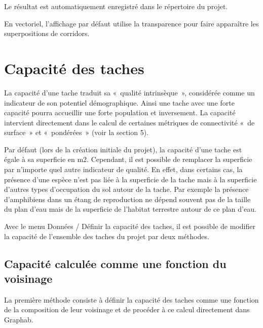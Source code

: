 \documentclass{article}
\begin{document}
Le résultat est automatiquement enregistré dans le répertoire du projet.

En vectoriel, l'affichage par défaut utilise la transparence pour faire apparaître les superpositions de corridors.


\section{Capacité des taches}

La capacité d’une tache traduit sa «~qualité intrinsèque~», considérée comme un indicateur de son potentiel démographique. Ainsi une tache avec une forte capacité pourra accueillir une forte population et inversement. La capacité intervient directement dans le calcul de certaines métriques de connectivité «~de surface~» et «~pondérées~» (voir la section 5).

Par défaut (lors de la création initiale du projet), la capacité d’une tache est égale à sa superficie en m2. Cependant, il est possible de remplacer la superficie par n’importe quel autre indicateur de qualité. En effet, dans certains cas, la présence d’une espèce n’est pas liée à la superficie de la tache mais à la superficie d’autres types d’occupation du sol autour de la tache. Par exemple la présence d’amphibiens dans un étang de reproduction ne dépend souvent pas de la taille du plan d’eau mais de la superficie de l’habitat terrestre autour de ce plan d’eau.

Avec le menu Données / Définir la capacité des taches, il est possible de modifier la capacité de l'ensemble des taches du projet par deux méthodes.

\subsection{Capacité calculée comme une fonction du voisinage}

La première méthode consiste à définir la capacité des taches comme une fonction de la composition de leur voisinage et de procéder à ce calcul directement dans Graphab.
\end{document}
